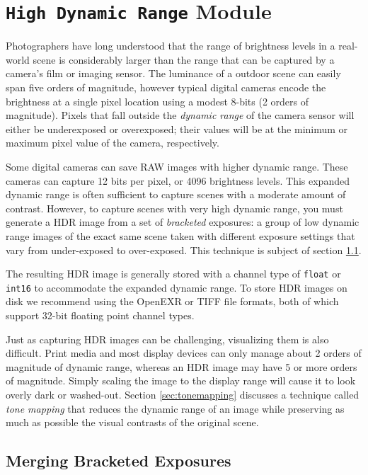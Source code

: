 \chapter{{\tt High Dynamic Range} Module}\label{ch:hdr-imaging}

Photographers have long understood that the range of brightness levels in
a real-world scene is considerably larger than the range that can be
captured by a camera's film or imaging sensor.  The luminance of a
outdoor scene can easily span five orders of magnitude, however
typical digital cameras encode the brightness at a single pixel
location using a modest 8-bits (2 orders of magnitude).  Pixels that
fall outside the {\em dynamic range} of the camera sensor will either
be underexposed or overexposed; their values will be at the minimum or
maximum pixel value of the camera, respectively.

Some digital cameras can save RAW images with higher dynamic range.
These cameras can capture 12 bits per pixel, or 4096 brightness
levels.  This expanded dynamic range is often sufficient to capture
scenes with a moderate amount of contrast. However, to capture scenes
with very high dynamic range, you must generate a HDR image from a set
of {\em bracketed} exposures: a group of low dynamic range images of
the exact same scene taken with different exposure settings that vary
from under-exposed to over-exposed.  This technique is subject of
section \ref{sec:hdr_merge}.

The resulting HDR image is generally stored with a channel type of
{\tt float} or {\tt int16} to accommodate the expanded dynamic range.
To store HDR images on disk we recommend using the OpenEXR or TIFF
file formats, both of which support 32-bit floating point channel
types.

Just as capturing HDR images can be challenging, visualizing them is
also difficult.  Print media and most display devices can only manage
about 2 orders of magnitude of dynamic range, whereas an HDR image may
have 5 or more orders of magnitude. Simply scaling the image to the
display range will cause it to look overly dark or washed-out. Section
\ref{sec:tonemapping} discusses a technique called {\em tone mapping}
that reduces the dynamic range of an image while preserving as much as
possible the visual contrasts of the original scene.

\section{Merging Bracketed Exposures}
\label{sec:hdr_merge}

